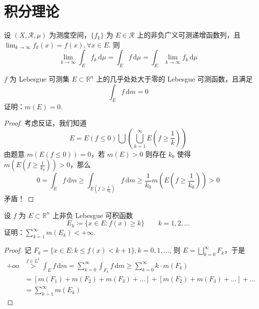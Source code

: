 \section{积分理论}

\begin{theorem}[Levi 定理]
设 $(X,\mathcal{R},\mu)$ 为测度空间，$\{ f_k \}$ 为 $E\in \mathcal{R}$ 上的非负广义可测递增函数列，且 $\lim_{ k \to \infty }f_k (x)=f (x),\forall x\in E$. 则
\[
\lim_{ k \to \infty } \int_{E}^{} f_k \, \mathrm{d}\mu=\int_{E}^{} f \, \mathrm{d}\mu=\int_{E}^{} \lim_{ k \to \infty } f_k \, \mathrm{d}\mu  
\]
\end{theorem}
\begin{exercise}
$f$ 为 Lebesgue 可测集 $E\subset \mathbb{R}^{n}$ 上的几乎处处大于零的 Lebesgue 可测函数，且满足
\[
\int_{E}^{} f \, \mathrm{d}m =0
\]
证明：$m(E)=0$.
\end{exercise}
\begin{proof}
考虑反证，我们知道
\[
E=E(f\leq 0)\bigcup\left( \bigcup_{k=1}^{\infty} E\left( f\geq \frac{1}{k} \right) \right)
\]
由题意 $m(E(f\leq0))=0$，若 $m(E)>0$ 则存在 $k_0$ 使得 $m\left( E\left( f\geq\frac{1}{k_0} \right) \right)>0$，那么
\[
0=\int_{E}^{} f \, \mathrm{d}m\geq \int_{E\left( f\geq \frac{1}{k_0}  \right)}^{} f  \, \mathrm{d}m\geq \frac{1}{k_0}m\left( E\left( f\geq \frac{1}{k_0}  \right) \right)>0
\]
矛盾！

\end{proof}

\begin{exercise}
设 $f$ 为 $E\subset \mathbb{R}^{n}$ 上非负 Lebesgue 可积函数
\[
E_k\coloneqq \{ x\in E :f(x)\geq k\}\qquad k=1,2,\dots
\]
证明：$\sum_{k=1}^{\infty}m(E_k)<+\infty$.
\end{exercise}
\begin{proof}
记 $F_k=\{ x\in E:k\leq f(x)<k+1 \},k=0,1,\dots$, 则 $E=\bigsqcup_{k=0}^{\infty}F_k$，于是
\[
\begin{aligned}
+oo & \overset{ f\in L^{1} }{ > } \int_{E}^{} f \, \mathrm{d}m =\sum_{k=0}^{\infty} \int_{F_k}^{} f \, \mathrm{d}m\geq \sum_{k=0}^{\infty} k\cdot m(F_k) \\
 & =[m(F_1)+m(F_2)+m(F_3)+\dots]+[m(F_2)+m(F_3)+\dots]+\dots \\
 & =\sum_{k=1}^{\infty} m(E_k)
\end{aligned}
\]
\end{proof}

